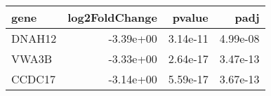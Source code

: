 \begin{tabular}{lrrr}
\toprule
  gene &  log2FoldChange &   pvalue &     padj \\
\midrule
DNAH12 &       -3.39e+00 & 3.14e-11 & 4.99e-08 \\
 VWA3B &       -3.33e+00 & 2.64e-17 & 3.47e-13 \\
CCDC17 &       -3.14e+00 & 5.59e-17 & 3.67e-13 \\
\bottomrule
\end{tabular}
